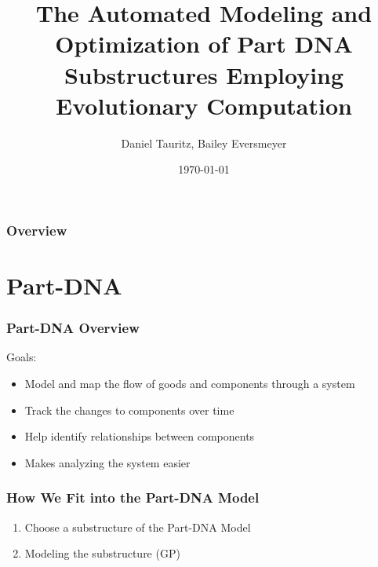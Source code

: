 \documentclass{beamer}
\title[Evolving Part-DNA Substructures]{The Automated Modeling and Optimization of Part DNA Substructures Employing Evolutionary Computation} %
\author{Daniel Tauritz, Bailey Eversmeyer} %
\institute[S\&T] %
{
Missouri University of Science and Technology \\ %
Department of Computer Science

\medskip
\textit{tauritzd@mst.edu, rbe62d@mst.edu} %
}
\date{\today} %
\begin{document}
\begin{frame}
\titlepage %
\end{frame}

\begin{frame}
\frametitle{Overview} %
\tableofcontents %
\end{frame}

\section{Part-DNA}

\begin{frame}
\frametitle{Part-DNA Overview}
Goals:
\begin{itemize}
\item Model and map the flow of goods and components through a system\pause
\item Track the changes to components over time\pause
\item Help identify relationships between components\pause
\item Makes analyzing the system easier
\end{itemize}
\end{frame}

\begin{frame}
\frametitle{How We Fit into the Part-DNA Model}
\begin{enumerate}
\item Choose a substructure of the Part-DNA Model\pause
\item Modeling the substructure (GP)
\end{enumerate}
\end{frame}
\end{document}
